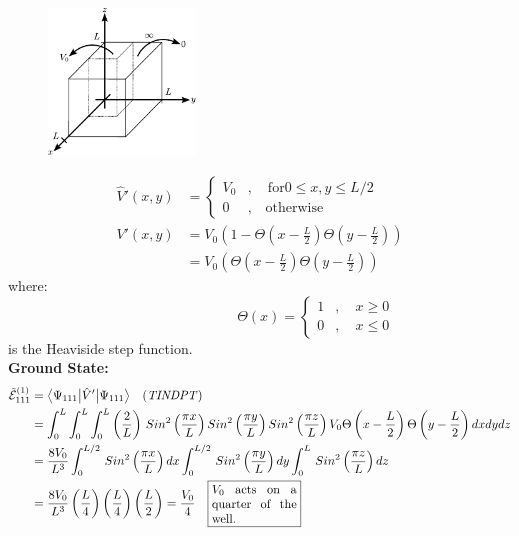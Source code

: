 \documentclass[12pt,fancychapters]{report}
\numberwithin{equation}{section}
\begin{document}
\begin{figure}
  \begin{center}
\includegraphics[width=0.35\textwidth]{../Figures/3DPE.pdf}
  \end{center}
\end{figure}
\begin{align*}
  \hat{V}'(x,y)&=\begin{cases}
    V_0 &,\quad \text{for} 0\leq x,y \leq L/2\\
    0&, \quad \text{otherwise}
  \end{cases}\\
    V'(x,y) &= V_0\left(1-\Theta\left(x-\frac{L}{2}\right) \Theta\left(y-\frac{L}{2}\right)\right)\\
            &= V_0\left(\Theta\left(x-\frac{L}{2}\right) \Theta\left(y-\frac{L}{2}\right) \right)
\end{align*}
\qquad \qquad \qquad\qquad \qquad \qquad \qquad\qquad\qquad   where: 
\[
 \qquad\qquad\qquad\qquad \Theta(x) = 
  \begin{cases}
    1 &,\quad x\geq 0\\
    0 &,\quad x \leq 0
  \end{cases}
\]
\qquad \qquad \qquad\qquad \qquad \qquad \qquad\qquad\qquad is the Heaviside step function.\\
\textbf{Ground State:}
\begin{align*}
  \tilde{\mathcal{E}}_{111}^{(1)} &= \big<\Psi_{111}\big|\hat{V}'\big|\Psi_{111} \big>\quad
  \text{(\emph{TINDPT})}\\
&= \int_{0}^{L}\int_{0}^{L}\int_{0}^{L}\left(\frac{2}{L}\right)\,Sin^2\left(\frac{\pi x}{L}\right)
  Sin^2\left(\frac{ \pi y}{L}\right)Sin^2\left(\frac{ \pi z}{L}\right)
  V_0\Theta\left(x-\frac{L}{2}\right) \Theta\left(y-\frac{L}{2}\right)dxdydz\\
&= \frac{8V_0}{L^3}\int_{0}^{L/2}\,Sin^2\left(\frac{\pi x}{L}\right)dx
\int_{0}^{L/2}\,Sin^2\left(\frac{\pi y}{L}\right)dy
\int_{0}^{L}\,Sin^2\left(\frac{\pi z}{L}\right)dz\\
&= \frac{8V_0}{L^3}\left(\frac{L}{4}\right)\left(\frac{L}{4}\right)\left(\frac{L}{2}\right)
=\frac{V_0}{4}  \quad \fbox{%
  \parbox{.2\textwidth}{%
    $V_0$ acts on a quarter of the well.}%
  }
\end{align*}
\end{document}
